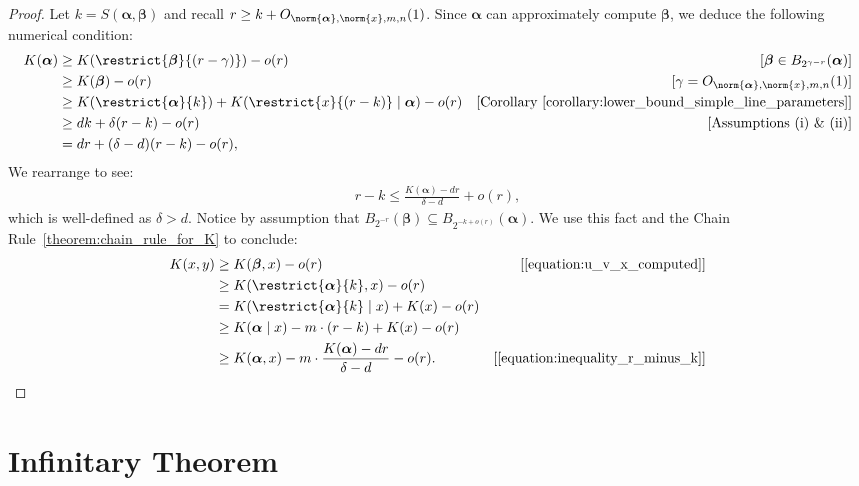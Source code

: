 \begin{proof}
Let $k = S(\boldsymbol{\alpha}, \boldsymbol{\beta})$ and recall $r \geq k + O_{\norm{\boldsymbol{\alpha}}, \norm{x}, m, n}(1)$. Since $\boldsymbol{\alpha}$ can approximately compute $\boldsymbol{\beta}$, we deduce the following numerical condition:
\begin{align*}
    K(\boldsymbol{\alpha}) &\geq K(\restrict{\boldsymbol{\beta}}{(r - \gamma)}) - o(r) & [\boldsymbol{\beta} \in B_{2^{\gamma - r}}(\boldsymbol{\alpha})]\\
        &\geq K(\boldsymbol{\beta}) - o(r) & [\text{$\gamma = O_{\norm{\boldsymbol{\alpha}}, \norm{x}, m, n}(1)$}]\\
        &\geq K(\restrict{\boldsymbol{\alpha}}{k}) + K(\restrict{x}{(r - k)} \mid \boldsymbol{\alpha}) - o(r) & [\text{Corollary~\ref{corollary:lower_bound_simple_line_parameters}}]\\
        &\geq dk + \delta (r - k) - o(r) & [\text{Assumptions (i) \& (ii)}]\\
        &= dr + (\delta - d) (r - k) - o(r),
\end{align*} 
We rearrange to see:
\begin{align}
    \label{equation:inequality_r_minus_k}
    r - k \leq \frac{K(\boldsymbol{\alpha}) - dr}{\delta - d} + o(r),
\end{align}
which is well-defined as $\delta > d$. Notice by assumption that $B_{2^{-r}}(\boldsymbol{\beta}) \subseteq B_{2^{-k + o(r)}}(\boldsymbol{\alpha})$. We use this fact and the Chain Rule~\ref{theorem:chain_rule_for_K} to conclude:
\begin{align*}
    K(x, y) &\geq K(\boldsymbol{\beta}, x) - o(r) & [\text{\eqref{equation:u_v_x_computed}}]\\
    &\geq K(\restrict{\boldsymbol{\alpha}}{k}, x) - o(r)\\
    &= K(\restrict{\boldsymbol{\alpha}}{k} \mid x) + K(x) - o(r)\\
    &\geq K(\boldsymbol{\alpha} \mid x) - m \cdot (r - k) + K(x) - o(r)\\
    &\geq K(\boldsymbol{\alpha}, x) - m \cdot \frac{K(\boldsymbol{\alpha}) - dr}{\delta - d} - o(r). & [\eqref{equation:inequality_r_minus_k}]
\end{align*}

\end{proof}

\section{Infinitary Theorem}

